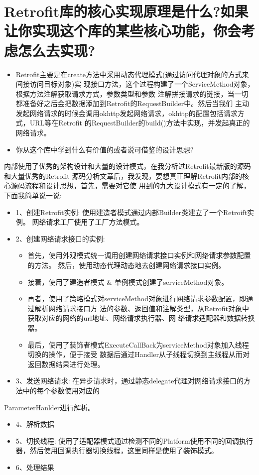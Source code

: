 \documentclass[9pt, b5paper]{article}
\begin{document}
\section{Retrofit库的核心实现原理是什么?如果让你实现这个库的某些核心功能，你会考虑怎么去实现?}
\label{sec-7}
\begin{itemize}
\item Retrofit主要是在create方法中采用动态代理模式(通过访问代理对象的方式来间接访问目标对象)实 现接口方法，这个过程构建了一个ServiceMethod对象，根据方法注解获取请求方式，参数类型和参数 注解拼接请求的链接，当一切都准备好之后会把数据添加到Retrofit的RequestBuilder中。然后当我们 主动发起网络请求的时候会调用okhttp发起网络请求，okhttp的配置包括请求方式，URL等在Retrofit 的RequestBuilder的build()方法中实现，并发起真正的网络请求。
\item 你从这个库中学到什么有价值的或者说可借鉴的设计思想?
\end{itemize}
内部使用了优秀的架构设计和大量的设计模式，在我分析过Retrofit最新版的源码和大量优秀的Retrofit 源码分析文章后，我发现，要想真正理解Retrofit内部的核心源码流程和设计思想，首先，需要对它使 用到的九大设计模式有一定的了解，下面我简单说一说:
\begin{itemize}
\item 1、创建Retrofit实例: 使用建造者模式通过内部Builder类建立了一个Retroift实例。 网络请求工厂使用了工厂方法模式。
\item 2、创建网络请求接口的实例:
\begin{itemize}
\item 首先，使用外观模式统一调用创建网络请求接口实例和网络请求参数配置的方法。 然后，使用动态代理动态地去创建网络请求接口实例。
\item 接着，使用了建造者模式 \& 单例模式创建了serviceMethod对象。
\item 再者，使用了策略模式对serviceMethod对象进行网络请求参数配置，即通过解析网络请求接口方 法的参数、返回值和注解类型，从Retrofit对象中获取对应的网络的url地址、网络请求执行器、网 络请求适配器和数据转换器。
\item 最后，使用了装饰者模式ExecuteCallBack为serviceMethod对象加入线程切换的操作，便于接受 数据后通过Handler从子线程切换到主线程从而对返回数据结果进行处理。
\end{itemize}
\item 3、发送网络请求: 在异步请求时，通过静态delegate代理对网络请求接口的方法中的每个参数使用对应的
\end{itemize}
ParameterHanlder进行解析。
\begin{itemize}
\item 4、解析数据
\item 5、切换线程: 使用了适配器模式通过检测不同的Platform使用不同的回调执行器，然后使用回调执行器切换线程，这里同样是使用了装饰模式。
\item 6、处理结果
\end{itemize}
\end{document}
